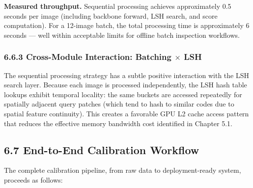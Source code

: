 \documentclass[12pt, a4paper, oneside]{report}
\begin{document}
\textbf{Measured throughput.} Sequential processing achieves approximately 0.5 seconds per image (including backbone forward, LSH search, and score computation). For a 12-image batch, the total processing time is approximately 6 seconds --- well within acceptable limits for offline batch inspection workflows.

\subsubsection{6.6.3 Cross-Module Interaction: Batching $\times$ LSH}\label{cross-module-interaction-batching-lsh}

The sequential processing strategy has a subtle positive interaction with the LSH search layer. Because each image is processed independently, the LSH hash table lookups exhibit temporal locality: the same buckets are accessed repeatedly for spatially adjacent query patches (which tend to hash to similar codes due to spatial feature continuity). This creates a favorable GPU L2 cache access pattern that reduces the effective memory bandwidth cost identified in Chapter 5.1.

\bigskip\noindent\hrulefill\bigskip

\subsection{6.7 End-to-End Calibration Workflow}\label{end-to-end-calibration-workflow}

The complete calibration pipeline, from raw data to deployment-ready system, proceeds as follows:
\end{document}
